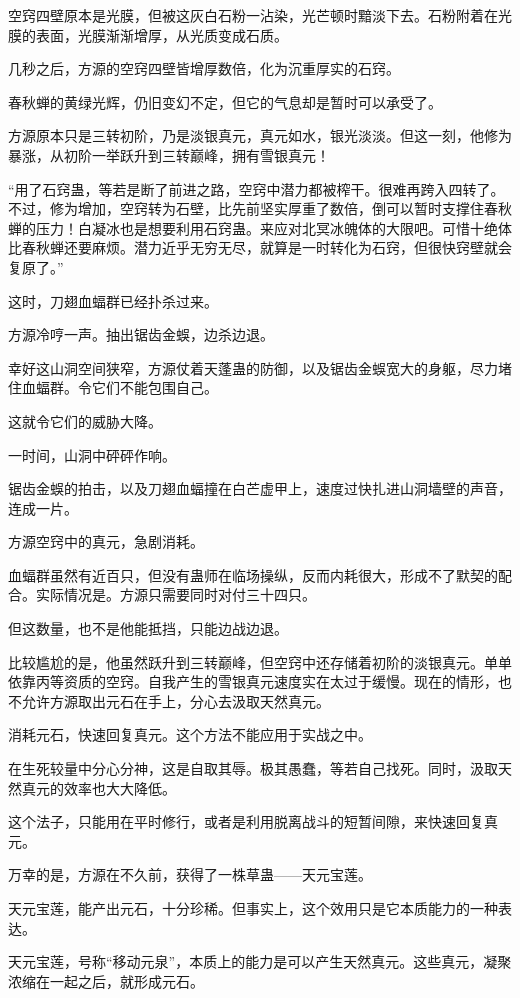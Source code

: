 \begin{this_body}
空窍四壁原本是光膜，但被这灰白石粉一沾染，光芒顿时黯淡下去。石粉附着在光膜的表面，光膜渐渐增厚，从光质变成石质。

几秒之后，方源的空窍四壁皆增厚数倍，化为沉重厚实的石窍。

春秋蝉的黄绿光辉，仍旧变幻不定，但它的气息却是暂时可以承受了。

方源原本只是三转初阶，乃是淡银真元，真元如水，银光淡淡。但这一刻，他修为暴涨，从初阶一举跃升到三转巅峰，拥有雪银真元！

“用了石窍蛊，等若是断了前进之路，空窍中潜力都被榨干。很难再跨入四转了。不过，修为增加，空窍转为石壁，比先前坚实厚重了数倍，倒可以暂时支撑住春秋蝉的压力！白凝冰也是想要利用石窍蛊。来应对北冥冰魄体的大限吧。可惜十绝体比春秋蝉还要麻烦。潜力近乎无穷无尽，就算是一时转化为石窍，但很快窍壁就会复原了。”

这时，刀翅血蝠群已经扑杀过来。

方源冷哼一声。抽出锯齿金蜈，边杀边退。

幸好这山洞空间狭窄，方源仗着天蓬蛊的防御，以及锯齿金蜈宽大的身躯，尽力堵住血蝠群。令它们不能包围自己。

这就令它们的威胁大降。

一时间，山洞中砰砰作响。

锯齿金蜈的拍击，以及刀翅血蝠撞在白芒虚甲上，速度过快扎进山洞墙壁的声音，连成一片。

方源空窍中的真元，急剧消耗。

血蝠群虽然有近百只，但没有蛊师在临场操纵，反而内耗很大，形成不了默契的配合。实际情况是。方源只需要同时对付三十四只。

但这数量，也不是他能抵挡，只能边战边退。

比较尴尬的是，他虽然跃升到三转巅峰，但空窍中还存储着初阶的淡银真元。单单依靠丙等资质的空窍。自我产生的雪银真元速度实在太过于缓慢。现在的情形，也不允许方源取出元石在手上，分心去汲取天然真元。

消耗元石，快速回复真元。这个方法不能应用于实战之中。

在生死较量中分心分神，这是自取其辱。极其愚蠢，等若自己找死。同时，汲取天然真元的效率也大大降低。

这个法子，只能用在平时修行，或者是利用脱离战斗的短暂间隙，来快速回复真元。

万幸的是，方源在不久前，获得了一株草蛊——天元宝莲。

天元宝莲，能产出元石，十分珍稀。但事实上，这个效用只是它本质能力的一种表达。

天元宝莲，号称“移动元泉”，本质上的能力是可以产生天然真元。这些真元，凝聚浓缩在一起之后，就形成元石。


\end{this_body}

